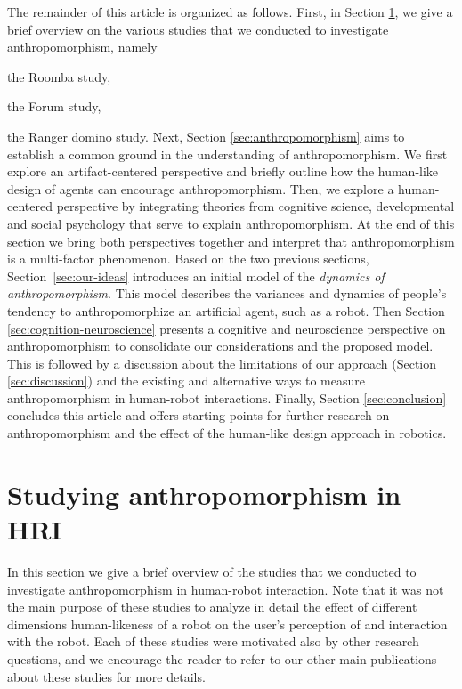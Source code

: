 \documentclass{frontiersSCNS} %
\begin{document}
\begin{inparaenum}

The remainder of this article is organized as follows.  First, in Section
\ref{sec:overview-studies}, we give a brief overview on the various studies that
we conducted to investigate anthropomorphism, namely \item the Roomba study,
\item the Forum study, \item the Ranger domino study. Next, Section
\ref{sec:anthropomorphism} aims to establish a common ground in the
understanding of anthropomorphism. We first explore an artifact-centered
perspective and briefly outline how the human-like design of agents can
encourage anthropomorphism.  Then, we explore a human-centered perspective
by integrating theories from cognitive science, developmental and social
psychology that serve to explain anthropomorphism. At the end of this
section we bring both perspectives together and interpret that
anthropomorphism is a multi-factor phenomenon.  Based on the two previous
sections, Section~\ref{sec:our-ideas} introduces an initial model of the
\textit{dynamics of anthropomorphism}. This model describes the variances
and dynamics of people's tendency to anthropomorphize an artificial agent,
such as a robot.  Then Section \ref{sec:cognition-neuroscience} presents a
cognitive and neuroscience perspective on anthropomorphism to consolidate
our considerations and the proposed model.  This is followed by a discussion
about the limitations of our approach (Section \ref{sec:discussion}) and the
existing and alternative ways to measure anthropomorphism in human-robot
interactions.  Finally, Section \ref{sec:conclusion} concludes this article
and offers starting points for further research on anthropomorphism and the
effect of the human-like design approach in robotics.

\end{inparaenum}


%
%
%
%
%
%

\section{Studying anthropomorphism in HRI}
\label{sec:overview-studies}

In this section we give a brief overview of the studies that we conducted to
investigate anthropomorphism in human-robot interaction. Note that it was not
the main purpose of these studies to analyze in detail the effect of different
dimensions human-likeness of a robot on the user's perception of and interaction
with the robot. Each of these studies were motivated also by other research
questions, and we encourage the reader to refer to our other main publications
about these studies for more details.
\end{document}
